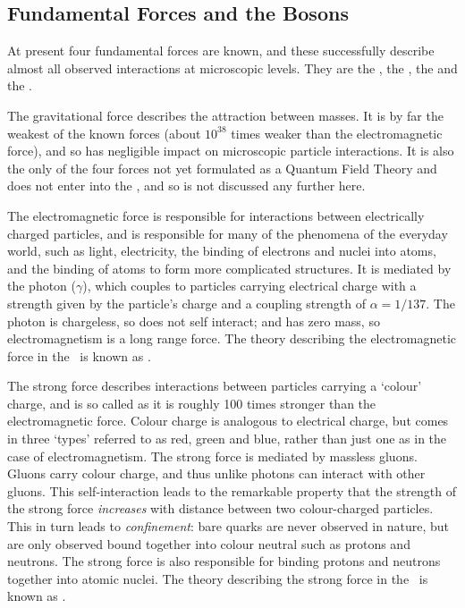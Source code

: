 \subsection{Fundamental Forces and the Bosons}

At present four fundamental forces are known, and these successfully describe
almost all observed interactions at microscopic levels. They are the
, the , the  
and the . 

The gravitational force describes the attraction
between masses. It is by far the
weakest of the known forces (about $10^{38}$ times weaker than the electromagnetic
force), and so has negligible impact on microscopic particle interactions. It is
also the only of the four forces not yet formulated as a Quantum Field
Theory and does not enter into the \sm, and so is not discussed any further here.

The electromagnetic force is responsible for interactions between electrically
charged particles, and is responsible for many of the phenomena of the everyday
world, such as light, electricity, the binding of electrons and nuclei into
atoms, and the binding of
atoms to form more complicated structures. 
It is mediated by the photon ($\gamma$), which couples to
particles carrying electrical charge with a strength given by the particle's
charge and a coupling strength of $\alpha=1/137$. The photon is chargeless, so
does not self interact; and has zero
mass, so electromagnetism is a long range force. The theory describing the electromagnetic force in the \sm\ is known
as .


The strong force describes interactions between particles carrying a `colour'
charge, and is so called as it is roughly 100 times stronger than the electromagnetic
force. Colour charge is analogous to electrical charge, but comes in three
`types' referred to as red, green and blue, rather than just one as in
the case of electromagnetism. The strong force is mediated by massless gluons. Gluons carry
colour charge, and thus unlike photons can interact with other gluons. This
self-interaction leads to the remarkable property that the strength of the strong force {\it
increases} with distance between two colour-charged particles. This in turn leads to {\it
confinement}: bare quarks are never observed in nature, but are only observed
bound together into colour neutral  such as protons and neutrons. 
The strong force is also responsible for binding protons and neutrons together
into atomic nuclei. The theory describing the strong force in the \sm\ is known
as .


